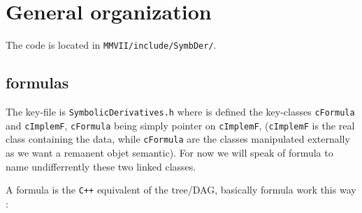 \section{General organization}


The code is located in  {\tt MMVII/include/SymbDer/}.

\subsection{formulas}

The key-file is {\tt SymbolicDerivatives.h}  where is defined   the key-classes   {\tt cFormula} and {\tt cImplemF},
{\tt cFormula} being simply pointer on {\tt cImplemF},  ({\tt cImplemF} is the real class containing the data, while
{\tt cFormula} are the classes manipulated externally as we want a remanent objet  semantic).
For now we will speak of formula to name undifferrently these two linked classes.


A formula is the {\tt C++} equivalent of the tree/DAG, basically formula work this way :

